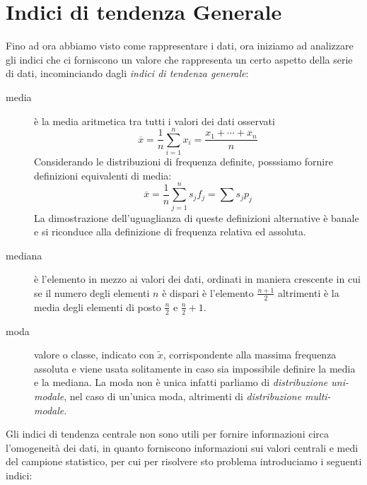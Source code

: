 \documentclass[a4paper,12pt, oneside]{book}
\begin{document}
\section{Indici di tendenza Generale}
Fino ad ora abbiamo visto come rappresentare i dati, ora iniziamo ad analizzare gli indici
che ci forniscono un valore che rappresenta un certo aspetto della serie di dati, 
incominciando dagli \emph{indici di tendenza generale}:
\begin{description}
    \item [media] è la media aritmetica tra tutti i valori dei dati osservati 
        \[ \overline{x} = \frac{1}{n} \sum _{i = 1} ^ n x_i = \frac{x_1 + \cdots + x_n}{n} \]
            Considerando le distribuzioni di frequenza definite, posssiamo fornire definizioni equivalenti di media:
                \[ \overline{x} = \frac{1}{n} \sum _{j = 1} ^ n s_j f_j = \sum s_j p_j \]
                La dimostrazione dell'uguaglianza di queste definizioni alternative è banale e si riconduce 
                alla definizione di frequenza relativa ed assoluta.

    \item [mediana] è l'elemento in mezzo ai valori dei dati, ordinati in maniera crescente
            in cui se il numero degli elementi $n$ è dispari è l'elemento $\frac{n + 1}{2}$
            altrimenti è la media degli elementi di posto $\frac{n}{2}$ e $\frac{n}{2} + 1$.

    \item [moda] valore o classe, indicato con $\widetilde{x}$, corrispondente alla massima frequenza assoluta
                 e viene usata solitamente in caso sia impossibile definire la media e la mediana.\newline
            La moda non è unica infatti parliamo di \emph{distribuzione uni-modale}, nel caso di un'unica moda,
            altrimenti di \emph{distribuzione multi-modale}.
\end{description}
Gli indici di tendenza centrale non sono utili per fornire informazioni circa l'omogeneità dei dati, in quanto forniscono 
informazioni sui valori centrali e medi del campione statistico, per cui per risolvere sto problema
introduciamo i seguenti indici:
\end{document}
